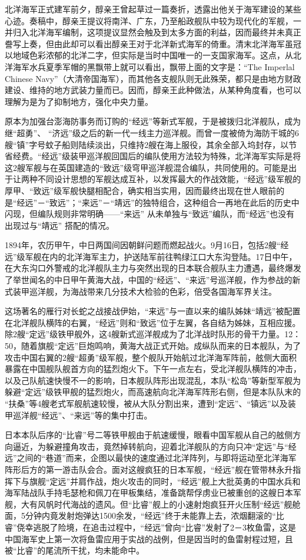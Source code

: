 \documentclass[12pt,UTF8]{ctexbook}
\begin{document}
北洋海军正式建军前夕，醇亲王曾起草过一篇奏折，透露出他关于海军建设的某些心迹。奏稿中，醇亲王提议将南洋、广东，乃至船政舰队中较为现代化的军舰，一并归入北洋海军编制，这项提议显然会触及到太多方面的利益，因而最终并未真正誊写上奏，但由此却可以看出醇亲王对于北洋新式海军的倚重。清末北洋海军虽冠以地域色彩浓郁的北洋二字，但实际是当时中国唯一的一支国家海军。这点，从北洋海军水兵夏季军帽的黑飘带上就可以看出，飘带上面的文字是：“The Imperlal Chinese Navy”（大清帝国海军），而其他各支舰队则无此殊荣，都只是由地方财政建设、维持的地方武装力量而已。因而，醇亲王此种做法，从某种角度看，也可以理解为是为了抑制地方，强化中央力量。

原本为加强台澎海防事务而订购的“经远”等新式军舰，于是被拨归北洋舰队，成为继“超勇”、 “济远”级之后的新一代一线主力巡洋舰。而曾一度被倚为海防干城的6艘“镇”字号蚊子船则陆续淡出，只维持2艘在海上服役，其余全部入坞封存，以节省经费。“经远”级装甲巡洋舰回国后的编队使用方法较为特殊，北洋海军实际是将这2艘军舰与在英国建造的“致远”级穹甲巡洋舰混合编队，共同使用的。可能是出于让两种不同设计思想的军舰达成互补，以发挥最大的作战效能，“经远”级军舰的厚甲、“致远”级军舰快腿相配合，确实相当实用，因而最终出现在世人眼前的是“经远”－“致远”；“来远”－“靖远”的独特组合，这种组合一再地在此后的历史中闪现，但编队规则非常明确——“来远” 从未单独与“致远”编队，而“经远”也没有出现过与“靖远” 搭配的情况。

1894年，农历甲午，中日两国间因朝鲜问题而燃起战火。9月16日，包括2艘“经远”级军舰在内的北洋海军主力，护送陆军前往鸭绿江口大东沟登陆。17日中午，在大东沟口外警戒的北洋舰队主力与突然出现的日本联合舰队主力遭遇，最终爆发了举世闻名的中日甲午黄海大战，中国的“经远”、“来远”号巡洋舰，作为参战的新式装甲巡洋舰，为海战带来几分技术大检验的色彩，倍受各国海军界关注。

这场著名的雁行对长蛇之战接战伊始，“来远”与一直以来的编队姊妹“靖远”被配置在北洋舰队横阵的右翼，“经远”则和“致远”位于左翼，各自结为姊妹，互相应援。除2艘“定远”级铁甲舰外，这4艘新式巡洋舰成为了北洋战时队形的骨干力量。12：50，随着旗舰“定远”巨炮鸣响，黄海大战正式开始。成纵队而来的日本舰队，为了攻击中国右翼的2艘“超勇”级军舰，整个舰队开始航过北洋海军阵前，舷侧大面积暴露在中国舰队舰首方向的猛烈炮火下。下午一点左右，受北洋舰队横阵的冲击，以及己队航速快慢不一的影响，日本舰队阵形出现混乱，本队“松岛”等新型军舰为躲避“定远”级铁甲舰的猛烈炮火，而高速航向北洋海军阵形右侧，但是本队队末的 “扶桑”等4艘老式军舰航速较慢，被从大队分割出来，遭到“定远”、“镇远”以及装甲巡洋舰“经远”、“来远”等的集中打击。

日本本队后序的“比睿”号二等铁甲舰由于航速缓慢，眼看中国军舰从自己的舷侧方向逼近，为躲避撞角攻击，竟然掉转航向，迎着北洋舰队的方向只冲“定远”与“经远”之间的“巷道”而来，企图以最快的速度通过北洋阵列，与即将运动至北洋海军阵形后方的第一游击队会合。面对这艘疯狂的日本军舰，“经远”舰在管带林永升指挥下与旗舰“定远”并肩作战，炮火攻击的同时，“经远”舰上大批英勇的中国水兵和海军陆战队手持毛瑟枪和佩刀在甲板集结，准备跳帮俘虏业已被重创的这艘日本军舰，大有风帆时代海战的遗风。但“比睿”舰上的小速射炮疯狂开火压制“经远”舰舱面，5分钟内竟发射炮弹达1500余发，“经远”终于未能靠上去，浓烟翻滚的“比睿”侥幸逃脱了险境，在追击过程中，“经远”曾向“比睿”发射了2－3枚鱼雷，这是中国海军史上第一次将鱼雷应用于实战的战例，但是因当时的鱼雷射程过短，且被“比睿”的尾流所干扰，均未能命中。
\end{document}
